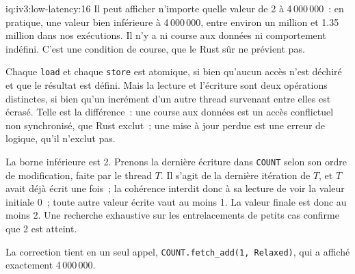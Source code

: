 \begin{solution}{iq:iv3:low-latency:16}
Il peut afficher n'importe quelle valeur de 2 à 4\,000\,000~: en pratique, une valeur bien inférieure à 4\,000\,000, entre environ un million et 1.35 million dans nos exécutions. Il n'y a ni course aux données ni comportement indéfini. C'est une condition de course, que le Rust sûr ne prévient pas.

Chaque \texttt{load} et chaque \texttt{store} est atomique, si bien qu'aucun accès n'est déchiré et que le résultat est défini. Mais la lecture et l'écriture sont deux opérations distinctes, si bien qu'un incrément d'un autre thread survenant entre elles est écrasé. Telle est la différence~: une course aux données est un accès conflictuel non synchronisé, que Rust exclut~; une mise à jour perdue est une erreur de logique, qu'il n'exclut pas.

La borne inférieure est 2. Prenons la dernière écriture dans \texttt{COUNT} selon son ordre de modification, faite par le thread $T$. Il s'agit de la dernière itération de $T$, et $T$ avait déjà écrit une fois~; la cohérence interdit donc à sa lecture de voir la valeur initiale 0~; toute autre valeur écrite vaut au moins 1. La valeur finale est donc au moins 2. Une recherche exhaustive sur les entrelacements de petits cas confirme que 2 est atteint.

La correction tient en un seul appel, \texttt{COUNT.fetch\_add(1, Relaxed)}, qui a affiché exactement 4\,000\,000.

\end{solution}

